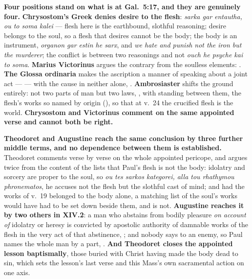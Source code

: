 \textbf{Four positions stand on what  is at Gal.\ 5:17, and
they are genuinely four.} \textbf{Chrysostom's Greek denies desire to
the flesh}: \emph{sarka gar entautha, ou to soma kalei} --- flesh here is the
earthbound, slothful reasoning; desire belongs to the soul, so a flesh that
desires cannot be the body; the body is an instrument, \emph{organon gar estin
he sarx}, and \emph{we hate and punish not the iron but the murderer}; the
conflict is between two reasonings and not \emph{ouch he psyche kai to soma}.
\textbf{Marius Victorinus} argues the contrary from the soulless elements:
. \textbf{The Glossa ordinaria} makes the ascription a manner of
speaking about a joint act ---  --- with the cause in neither alone, . \textbf{Ambrosiaster} shifts the ground entirely: not two
parts of man but two laws, , with  standing between them, the flesh's works so named by origin
(), so that at v.~24 the
crucified flesh is the world. \textbf{Chrysostom and Victorinus comment on the
same appointed verse and cannot both be right.}

\textbf{Theodoret and Augustine reach the same conclusion by three further
middle terms, and no dependence between them is established.} Theodoret
comments verse by verse on the whole appointed pericope, and argues twice from
the content of the lists that Paul's flesh is not the body: idolatry and sorcery
are proper to the soul, so \emph{ou tes sarkos kategorei, alla tou rhathymou
phronematos}, he accuses not the flesh but the slothful cast of mind; and had
the works of v.~19 belonged to the body alone, a matching list of the soul's
works would have had to be set down beside them, and is not. \textbf{Augustine
reaches it by two others in  XIV.2}: a man who abstains
from bodily pleasure \emph{on account of} idolatry or heresy is convicted by
apostolic authority of damnable works of the flesh in the very act of that
abstinence, ; and nobody says  to an
enemy, so Paul names the whole man by a part, . \textbf{And Theodoret closes the appointed lesson
baptismally}, those buried with Christ having made the body dead to sin, which
sets the lesson's last verse and this Mass's own sacramental action on one axis.

